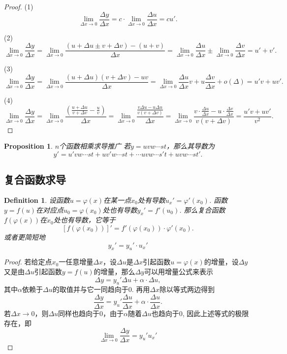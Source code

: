 \documentclass{article}
\newtheorem{proposition}[theorem]{Proposition}
\newtheorem{definition}[theorem]{Definition}
\begin{document}
\begin{proof}
{\color{red}(1)}
$$
\lim\limits_{\Delta x \rightarrow 0} \frac{\Delta y}{\Delta x} = c \cdot \lim\limits_{\Delta x \rightarrow 0} \frac{\Delta u}{\Delta x} = cu'.
$$

{\color{red}(2)}
$$
\lim\limits_{\Delta x \rightarrow 0} \frac{\Delta y}{\Delta x} = \lim\limits_{\Delta x \rightarrow 0} \frac{(u+\Delta u \pm v+\Delta v)-(u+v)}{\Delta x} = \lim\limits_{\Delta x \rightarrow 0} \frac{\Delta u}{\Delta x} \pm \lim\limits_{\Delta x \rightarrow 0} \frac{\Delta v}{\Delta x} = u'+v'.
$$

{\color{red}(3)}
$$
\lim\limits_{\Delta x \rightarrow 0} \frac{\Delta y}{\Delta x} = \lim\limits_{\Delta x \rightarrow 0} \frac{(u+\Delta u)(v+\Delta v)-uv}{\Delta x} = \lim\limits_{\Delta x \rightarrow 0} \frac{\Delta u}{\Delta x}v + u\frac{\Delta v}{\Delta x} + o(\Delta) = u'v + uv'.
$$

{\color{red}(4)}
$$
\lim\limits_{\Delta x \rightarrow 0} \frac{\Delta y}{\Delta x} = \lim\limits_{\Delta x \rightarrow 0} \frac{(\frac{u+\Delta u}{v+\Delta v} - \frac{u}{v})}{\Delta x} = \lim\limits_{\Delta x \rightarrow 0} \frac{\frac{v\Delta u-u\Delta u}{v(v+\Delta v)}}{\Delta x} = \lim\limits_{\Delta x \rightarrow 0} \frac{v\cdot \frac{\Delta u}{\Delta x}- u \cdot \frac{\Delta v}{\Delta x}}{v(v+\Delta v)} = \frac{u'v + uv'}{v^2}.
$$
\end{proof}

\begin{proposition}
\rm {\color{red} $n$个函数相乘求导推广} 若$y = uvw\cdots st$，那么其导数为
$$
y' = u'vw\cdots st + uv'w\cdots st + \cdots uvw\cdots s't + uvw\cdots s t'.
$$
\end{proposition}

\subsection{复合函数求导}

\begin{definition}
\rm 设函数$u=\varphi(x)$在某一点$x_0$处有导数$u_x' = \varphi'(x_0)$. 函数$y=f(u)$在对应点$u_0 = \varphi(x_0)$处也有导数$y_x' = f'(u_0)$. 那么复合函数$f(\varphi(x))$在$x_0$处也有导数，它等于
$$
\left[ f(\varphi(x_0))\right]' =  f'(\varphi(x_0)) \cdot \varphi'(x_0).
$$
或者更简短地
$$
y_x' = y_u' \cdot u_x'
$$
\end{definition}

\begin{proof}
若给定点$x_0$一任意增量$\Delta x$，设$\Delta u$是$\Delta x$引起函数$u=\varphi(x)$的增量，设$\Delta y$又是由$\Delta u$引起函数$y=f(u)$的增量，那么$\Delta y$可以用增量公式来表示
$$
\Delta y = y_u' \Delta u + \alpha \cdot \Delta u,
$$
其中$\alpha$依赖于$\Delta u$的取值并与它一同趋向于$0$. 再用$\Delta x$除以等式两边得到
$$
\frac{\Delta y}{\Delta x} = y_u'\frac{\Delta u}{\Delta x} + \alpha \cdot \frac{\Delta u}{\Delta x}.
$$
若$\Delta x \rightarrow 0$，则$\Delta u$同样也趋向于$0$，由于$\alpha$随着$\Delta u$也趋向于$0$, 因此上述等式的极限存在，即
$$
\lim\limits_{\Delta x \rightarrow 0} \frac{\Delta y}{\Delta x} = y_u' u_x'
$$
\end{proof}
\end{document}
